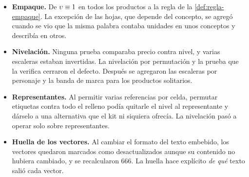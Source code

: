 \begin{evolucion}[: catálogo]
\begin{itemize}
  \item \textbf{Empaque.} De $\upsilon\equiv1$ en todos los productos a la regla
        de la \cref{def:regla-empaque}. La excepción de las hojas, que depende
        del concepto, se agregó cuando se vio que la misma palabra contaba
        unidades en unos conceptos y describía en otros.
  \item \textbf{Nivelación.} Ninguna prueba comparaba precio contra nivel, y
        varias escaleras estaban invertidas. La nivelación por permutación y
        la prueba que la verifica cerraron el defecto. Después se agregaron
        las escaleras por personaje y la banda de marca para los productos
        solitarios.
  \item \textbf{Representantes.} Al permitir varias referencias por celda,
        permutar etiquetas contra todo el relleno podía quitarle el nivel al
        representante y dárselo a una alternativa que el kit ni siquiera
        ofrecía. La nivelación pasó a operar solo sobre representantes.
  \item \textbf{Huella de los vectores.} Al cambiar el formato del texto
        embebido, los vectores quedaron marcados como desactualizados aunque
        su contenido no hubiera cambiado, y se recalcularon 666. La huella
        hace explícito \emph{de qué} texto salió cada vector.
\end{itemize}
\end{evolucion}
